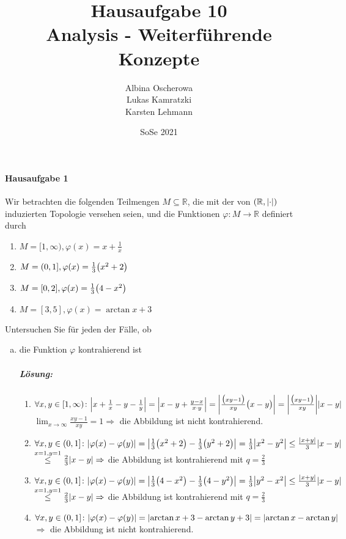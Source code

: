 \documentclass{scrreprt}
\author{Albina Oscherowa \\ Lukas Kamratzki \\ Karsten Lehmann}
\date{SoSe 2021}
\title{Hausaufgabe 10 \\Analysis - Weiterführende Konzepte}
\begin{document}
\paragraph{Hausaufgabe 1} Wir betrachten die folgenden Teilmengen
$M \subseteq \mathbb{R}$, die mit der von $\qty(\mathbb{R}, \abs{\cdot})$
induzierten Topologie versehen seien, und die Funktionen
$\varphi \colon M \to \mathbb{R}$ definiert durch
\begin{multicols}{2}
  \begin{enumerate}[(1)]
  \item $M = [1, \infty), \varphi(x) = x + \frac{1}{x}$
  \item $M = (0, 1], \varphi(x) = \frac{1}{3}\qty\big(x^2 + 2)$
  \item $M = [0, 2], \varphi(x) = \frac{1}{3}\qty\big(4 - x^2)$
  \item $M = [3, 5], \varphi(x) = \arctan x + 3$
  \end{enumerate}
\end{multicols}
Untersuchen Sie für jeden der Fälle, ob
\begin{enumerate}[a)]
\item die Funktion $\varphi$ kontrahierend ist

  \subparagraph{Lösung:}
  \begin{enumerate}[(1)]
  \item $\forall x, y \in [1, \infty) \colon \abs{x + \frac{1}{x} - y - \frac{1}{y}}
    = \abs{x - y + \frac{y - x}{x \cdot y}}
    = \abs{\frac{\qty\big(xy - 1)}{xy} \qty\big(x - y)}
    = \abs{\frac{\qty\big(xy - 1)}{xy}} \abs{x - y}$
    $\lim_{x \to \infty}\frac{xy - 1}{xy} = 1 \Rightarrow$ die Abbildung ist nicht kontrahierend.
  \item $\forall x, y \in (0, 1] \colon \abs{\varphi(x) - \varphi(y)}
    = \abs{\frac{1}{3}\qty\big(x^2 + 2) - \frac{1}{3}\qty\big(y^2 + 2)}
    = \frac{1}{3}\abs{x^2 - y^2}
    \leq \frac{\abs{x + y}}{3}\abs{x - y}$
    $\overset{x = 1, y = 1} \leq \frac{2}{3}\abs{x - y}
    \Rightarrow$ die Abbildung ist kontrahierend mit
    $q = \frac{2}{3}$
  \item $\forall x, y \in (0, 1] \colon \abs{\varphi(x) - \varphi(y)}
    = \abs{\frac{1}{3}\qty\big(4 - x^2) - \frac{1}{3}\qty\big(4 - y^2)}
    = \frac{1}{3}\abs{y^2 - x^2}
    \leq \frac{\abs{x + y}}{3}\abs{x - y}$
    $\overset{x = 1, y = 1} \leq \frac{2}{3}\abs{x - y}
    \Rightarrow$ die Abbildung ist kontrahierend mit
    $q = \frac{2}{3}$
  \item $\forall x, y \in (0, 1] \colon \abs{\varphi(x) - \varphi(y)}
    = \abs{\arctan x + 3 - \arctan y + 3} = \abs{\arctan x - \arctan y}$
    $\Rightarrow$ die Abbildung ist nicht kontrahierend.
  \end{enumerate}
\end{enumerate}
\end{document}
